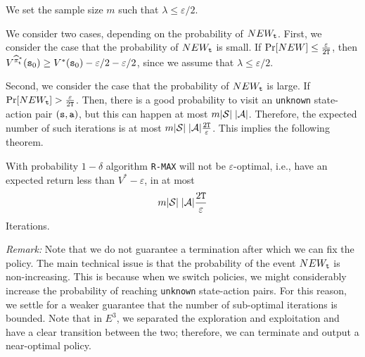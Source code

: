We set the sample size $m$ such that $\lambda \leq\varepsilon/2$.

We consider two cases, depending on the probability of $NEW_{\tt t}$. First,
we consider the case that the probability of $NEW_{\tt t}$ is small. If
$\Pr[NEW]\leq \frac{\varepsilon}{2{\tt T}}$, then
$V^{\widehat{\pi}^*_{\tt t}}({\tt s}_0)\geq V^*({\tt s}_0)
-\varepsilon/2 -\varepsilon/2$, since we assume that $\lambda\leq
\varepsilon/2$.

Second, we consider the case that the probability of $NEW_{\tt t}$ is large.
If $\Pr[NEW_{\tt t}] > \frac{\varepsilon}{2{\tt T}}$. Then, there is a good
probability to visit an \texttt{unknown} state-action pair $({\tt s},{\tt a})$, but this
can happen at most $m|\mathcal{S}|\;|\mathcal{A}|$. Therefore, the expected
number of such iterations is at most
$m|\mathcal{S}|\;|\mathcal{A}|\frac{2{\tt T}}{\varepsilon}$.
This implies the following theorem.


\begin{theorem}
With probability $1-\delta$ algorithm \texttt{R-MAX} will not be $\varepsilon$-optimal, i.e., have an expected return less than $V^*-\varepsilon$, in at most 
\[
m|\mathcal{S}|\;|\mathcal{A}|\frac{2{\tt T}}{\varepsilon}
\]
Iterations.
\end{theorem}

\noindent\textit{Remark:} Note that we do not guarantee a termination after which we can fix the policy. The main technical issue is that the probability of the event $NEW_{\tt t}$ is non-increasing. This is because when we switch policies, we might considerably increase the probability of reaching \texttt{unknown} state-action pairs. For this reason, we settle for a weaker guarantee that the number of sub-optimal iterations is bounded. Note that in $E^3$, we separated the exploration and exploitation and have a clear transition between the two; therefore, we can terminate and output a near-optimal policy.


